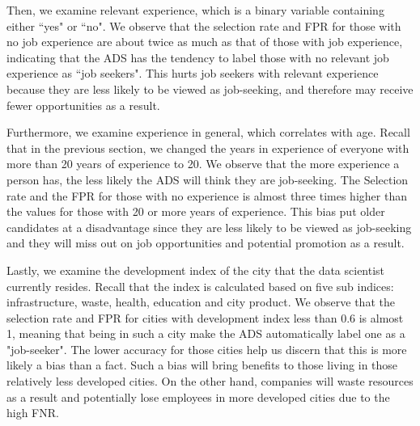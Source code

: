 Then, we examine relevant experience, which is a binary variable containing either ``yes" or ``no". We observe that the selection rate and FPR for those with no job experience are about twice as much as that of those with job experience, indicating that the ADS has the tendency to label those with no relevant job experience as ``job seekers". This hurts job seekers with relevant experience because they are less likely to be viewed as job-seeking, and therefore may receive fewer opportunities as a result.

Furthermore, we examine experience in general, which correlates with age. Recall that in the previous section, we changed the years in experience of everyone with more than 20 years of experience to 20. We observe that the more experience a person has, the less likely the ADS will think they are job-seeking. The Selection rate and the FPR for those with no experience is almost three times higher than the values for those with 20 or more years of experience. This bias put older candidates at a disadvantage since they are less likely to be viewed as job-seeking and they will miss out on job opportunities and potential promotion as a result.

Lastly, we examine the development index of the city that the data scientist currently resides. Recall that the index is calculated based on five sub indices: infrastructure, waste, health, education and city product. We observe that the selection rate and FPR for cities with development index less than 0.6 is almost 1, meaning that being in such a city make the ADS automatically label one as a "job-seeker". The lower accuracy for those cities help us discern that this is more likely a bias than a fact. Such a bias will bring benefits to those living in those relatively less developed cities. On the other hand, companies will waste resources as a result and potentially lose employees in more developed cities due to the high FNR. 

